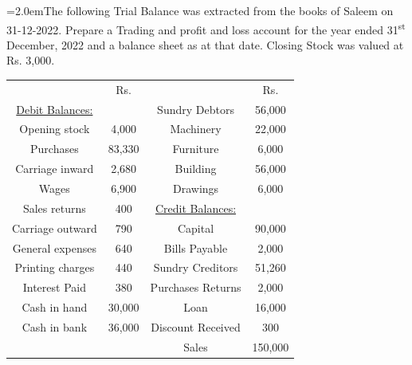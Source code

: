 \documentclass[11pt,a4paper]{article}
\newcommand{\lqn}[2]{\Needspace{6\baselineskip}\par\medskip\noindent\hangindent=2.0em\hangafter=1\makebox[2.0em][l]{\textbf{#1.}}#2\par}
\begin{document}
\lqn{91}{The following Trial Balance was extracted from the books of Saleem on 31-12-2022. Prepare a Trading and profit and loss account for the year ended 31\textsuperscript{st}  December, 2022 and a balance sheet as at that date. Closing Stock was valued at Rs. 3,000.\par
\par\smallskip\noindent\hspace*{1.2em}\begin{tabular}{|cccc|}
\hline
 & Rs. &  & Rs. \\
\underline{Debit Balances:} &  & Sundry Debtors & 56,000 \\
Opening stock & 4,000 & Machinery & 22,000 \\
Purchases & 83,330 & Furniture & 6,000 \\
Carriage inward & 2,680 & Building & 56,000 \\
Wages & 6,900 & Drawings & 6,000 \\
Sales returns & 400 & \underline{Credit Balances:} &  \\
Carriage outward & 790 & Capital & 90,000 \\
General expenses & 640 & Bills Payable & 2,000 \\
Printing charges & 440 & Sundry Creditors & 51,260 \\
Interest Paid & 380 & Purchases Returns & 2,000 \\
Cash in hand & 30,000 & Loan & 16,000 \\
Cash in bank & 36,000 & Discount Received & 300 \\
 &  & Sales & 150,000 \\
\hline
\end{tabular}\par\smallskip
}
\end{document}
